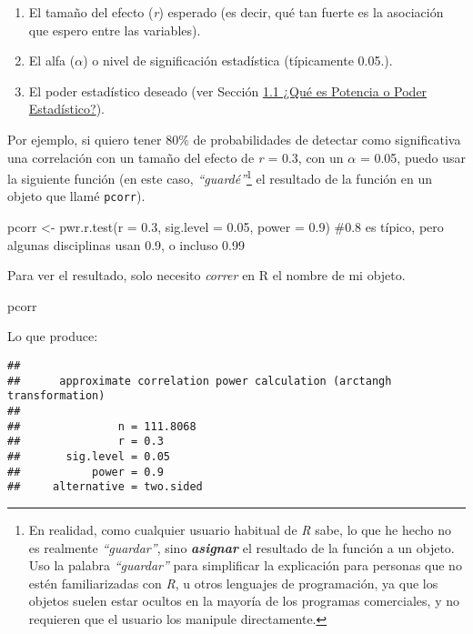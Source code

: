 \documentclass[
]{article}
\newenvironment{Shaded}{\begin{snugshade}}{\end{snugshade}}
\newcommand{\AttributeTok}[1]{\textcolor[rgb]{0.16,0.50,0.73}{#1}}
\newcommand{\CommentTok}[1]{\textcolor[rgb]{0.48,0.49,0.49}{#1}}
\newcommand{\FloatTok}[1]{\textcolor[rgb]{0.96,0.45,0.00}{#1}}
\newcommand{\FunctionTok}[1]{\textcolor[rgb]{0.56,0.27,0.68}{#1}}
\newcommand{\NormalTok}[1]{\textcolor[rgb]{0.81,0.81,0.76}{#1}}
\newcommand{\OtherTok}[1]{\textcolor[rgb]{0.15,0.68,0.38}{#1}}
\providecommand{\tightlist}{%
  \setlength{\itemsep}{0pt}\setlength{\parskip}{0pt}}
\begin{document}
\begin{enumerate}
\def\labelenumi{\arabic{enumi}.}
\tightlist
\item
  El tamaño del efecto (\emph{r}) esperado (es decir, qué tan fuerte es
  la asociación que espero entre las variables).
\item
  El alfa (\(\alpha\)) o nivel de significación estadística (típicamente
  0.05.).
\item
  El poder estadístico deseado (ver Sección
  \protect\hyperlink{power}{1.1 ¿Qué es Potencia o Poder Estadístico?}).
\end{enumerate}

Por ejemplo, si quiero tener 80\% de probabilidades de detectar como
significativa una correlación con un tamaño del efecto de \emph{r} =
0.3, con un \(\alpha\) = 0.05, puedo usar la siguiente función (en este
caso, \emph{``guardé''}\footnote{En realidad, como cualquier usuario
  habitual de \emph{R} sabe, lo que he hecho no es realmente
  \emph{``guardar''}, sino \textbf{\emph{asignar}} el resultado de la
  función a un objeto. Uso la palabra \emph{``guardar''} para
  simplificar la explicación para personas que no estén familiarizadas
  con \emph{R}, u otros lenguajes de programación, ya que los objetos
  suelen estar ocultos en la mayoría de los programas comerciales, y no
  requieren que el usuario los manipule directamente.} el resultado de
la función en un objeto que llamé \texttt{pcorr}).

\begin{Shaded}
\begin{Highlighting}[]
\NormalTok{pcorr }\OtherTok{\textless{}{-}} \FunctionTok{pwr.r.test}\NormalTok{(}\AttributeTok{r =} \FloatTok{0.3}\NormalTok{, }
           \AttributeTok{sig.level =} \FloatTok{0.05}\NormalTok{,}
           \AttributeTok{power =} \FloatTok{0.9}\NormalTok{) }\CommentTok{\#0.8 es típico, pero algunas disciplinas usan 0.9, o incluso 0.99}
\end{Highlighting}
\end{Shaded}

Para ver el resultado, solo necesito \emph{correr} en R el nombre de mi
objeto.

\begin{Shaded}
\begin{Highlighting}[]
\NormalTok{pcorr}
\end{Highlighting}
\end{Shaded}

Lo que produce:

\begin{verbatim}
## 
##      approximate correlation power calculation (arctangh transformation) 
## 
##               n = 111.8068
##               r = 0.3
##       sig.level = 0.05
##           power = 0.9
##     alternative = two.sided
\end{verbatim}
\end{document}
